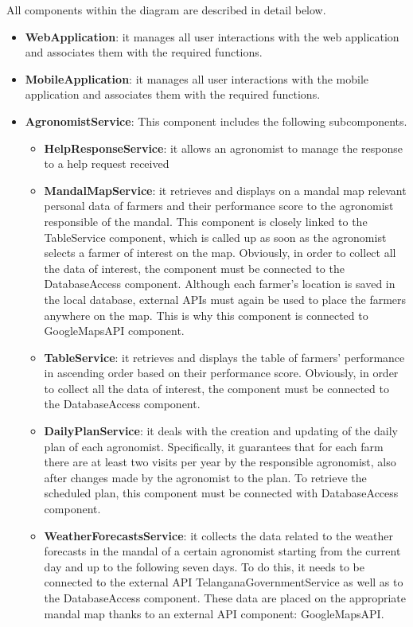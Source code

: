All components within the diagram are described in detail below.
\begin{itemize}

\item \textbf{WebApplication}: it manages all user interactions with the web application and associates them with the required functions.

\item \textbf{MobileApplication}: it manages all user interactions with the mobile application and associates them with the required functions.

\item \textbf{AgronomistService}: This component includes the following subcomponents.

\begin{itemize}
    \item \textbf{HelpResponseService}: it allows an agronomist to manage the response to a help request received
    \item \textbf{MandalMapService}: it retrieves and displays on a mandal map relevant personal data of farmers and their performance score to the agronomist responsible of the mandal. This component is closely linked to the TableService component, which is called up as soon as the agronomist selects a farmer of interest on the map. Obviously, in order to collect all the data of interest, the component must be connected to the DatabaseAccess component. Although each farmer's location is saved in the local database, external APIs must again be used to place the farmers anywhere on the map. This is why this component is connected to GoogleMapsAPI component.
    \item \textbf{TableService}: it retrieves and displays the table of farmers’ performance in ascending order based on their performance score. Obviously, in order to collect all the data of interest, the component must be connected to the DatabaseAccess component.
    \item \textbf{DailyPlanService}: it deals with the creation and updating of the daily plan of each agronomist. Specifically, it guarantees that for each farm there are at least two visits per year by the responsible agronomist, also after changes made by the agronomist to the plan. To retrieve the scheduled plan, this component must be connected with DatabaseAccess component.
    \item \textbf{WeatherForecastsService}: it collects the data related to the weather forecasts in the mandal of a certain agronomist starting from the current day and up to the following seven days. To do this, it needs to be connected to the external API TelanganaGovernmentService as well as to the DatabaseAccess component. These data are placed on the appropriate mandal map thanks to an external API component: GoogleMapsAPI.

\end{itemize}
\end{itemize}
